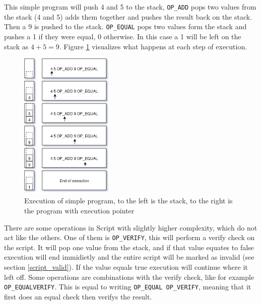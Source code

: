 This simple program will push 4 and 5 to the stack, \texttt{OP\_ADD} pops two values from the stack (4 and 5) adds them together and pushes the result back on the stack. Then a 9 is pushed to the stack. \texttt{OP\_EQUAL} pops two values form the stack and pushes a 1 if they were equal, 0 otherwise. In this case a 1 will be left on the stack as $4 + 5 = 9$. Figure \ref{fig:script} visualizes what happens at each step of execution.
\\
\begin{figure}[H]
	\centering
	\includegraphics[width=0.4\textwidth]{background/images/script.png}
	\caption{Execution of simple program, to the left is the stack, to the right is the program with execution pointer}
	\label{fig:script}
\end{figure}


There are some operations in Script with slightly higher complexity, which do not act like the others. One of them is \texttt{OP\_VERIFY}, this will perform a verify check on the script. It will pop one value from the stack, and if that value equates to false execution will end immidietly and the entire script will be marked as invalid (see section \ref{script_valid}). If the value equals true execution will continue where it left off. Some operations are combinations with the verify check, like for example \texttt{OP\_EQUALVERIFY}. This is equal to writing \texttt{OP\_EQUAL OP\_VERIFY}, meaning that it first does an equal check then verifys the result.

